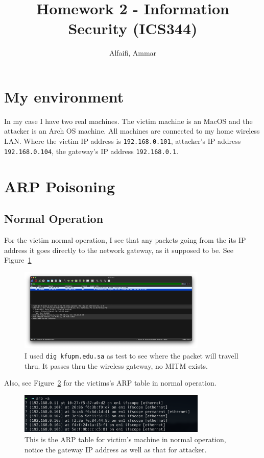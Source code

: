 \documentclass{article}
\title{Homework 2 - Information Security (ICS344)}
\author{Alfaifi, Ammar}
\date{}
\def\c#1{\texttt{#1}}
\begin{document}
\maketitle

\section{My environment}
In my case I have two real machines. The victim machine is an MacOS and the attacker is an Arch OS machine.
All machines are connected to my home wireless LAN. Where the victim IP address is \c{192.168.0.101}, attacker's 
IP address \c{192.168.0.104}, the gateway's IP address \c{192.168.0.1}.

\section{ARP Poisoning}

\subsection{Normal Operation}
For the victim normal operation, I see that any packets going from the its IP address it goes directly to the network gateway, as it supposed to be. See Figure~\ref{fig:norm-op}

\begin{figure}[ht]
	\centering
	\includegraphics[width=0.8\textwidth]{figures/norm-op.png}
  \caption{I used \c{dig kfupm.edu.sa} as test to see where the packet will travell thru. It passes thru the wireless gateway, no MITM exists.}
	\label{fig:norm-op}
\end{figure}

Also, see Figure~\ref{fig:arp-norm} for the victims's ARP table in normal operation.

\begin{figure}[ht]
	\centering
	\includegraphics[width=0.8\textwidth]{figures/arp-norm.png}
  \caption{This is the ARP table for victim's machine in normal operation, notice the gateway IP address as well as that for attacker.}
	\label{fig:arp-norm}
\end{figure}
\end{document}
